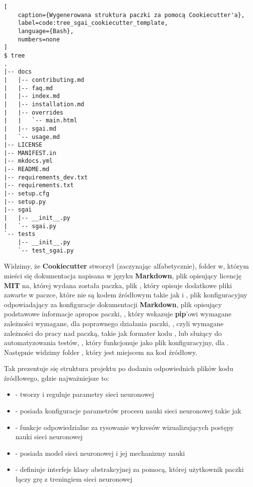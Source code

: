 \begin{onepage}
    \begin{lstlisting}[
    caption={Wygenerowana struktura paczki za pomocą Cookiecutter'a},
    label=code:tree_sgai_cookiecutter_template,
    language={Bash},
    numbers=none
]
$ tree
.
|-- docs
|   |-- contributing.md
|   |-- faq.md
|   |-- index.md
|   |-- installation.md
|   |-- overrides
|   |   `-- main.html
|   |-- sgai.md
|   `-- usage.md
|-- LICENSE
|-- MANIFEST.in
|-- mkdocs.yml
|-- README.md
|-- requirements_dev.txt
|-- requirements.txt
|-- setup.cfg
|-- setup.py
|-- sgai
|   |-- __init__.py
|   `-- sgai.py
`-- tests
    |-- __init__.py
    `-- test_sgai.py
    \end{lstlisting}
\end{onepage}


Widzimy, że \textbf{Cookiecutter} stworzył (zaczynając alfabetycznie), folder  w, którym mieści się dokumentacja napisana w języku \textbf{Markdown}, plik  opisujący licencję \textbf{MIT} \cite{LicencjaMIT} na, której wydana została paczka, plik , który opisuje dodatkowe pliki zawarte w paczce, które nie są kodem źródłowym takie jak  i , plik konfiguracyjny  odpowiadający za konfiguracje dokumentacji \textbf{Markdown}, plik  opisujący podstawowe informacje apropos paczki, , który wskazuje \textbf{pip}'owi wymagane zależności wymagane, dla poprawnego działania paczki, , czyli wymagane zależności do pracy nad paczką, takie jak formater kodu , lub  służący do automatyzowania testów, , który funkcjonuje jako plik konfiguracyjny, dla .
Następnie widzimy folder , który jest miejscem na kod źródłowy.


\clearpage

Tak prezentuje się struktura projektu po dodaniu odpowiednich plików kodu źródłowego, gdzie najważniejsze to:

\begin{itemize}
    \item {} - tworzy i reguluje parametry sieci neuronowej
    \item {} - posiada konfiguracje parametrów procesu nauki sieci neuronowej takie jak 
    \item {} - funkcje odpowiedzialne za rysowanie wykresów wizualizujących postępy nauki sieci neuronowej
    \item {} - posiada model sieci neuronowej i jej mechanizmy nauki
    \item {} - definiuje interfejs klasy abstrakcyjnej za pomocą, której użytkownik paczki łączy grę z treningiem sieci neuronowej
\end{itemize}

